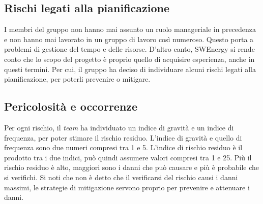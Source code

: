 \subsection{Rischi legati alla pianificazione}
I membri del gruppo non hanno mai assunto un ruolo manageriale in
precedenza e non hanno mai lavorato in un gruppo di lavoro così
numeroso. Questo porta a problemi di gestione del tempo e delle
risorse. D'altro canto, SWEnergy si rende conto che lo scopo del
progetto è proprio quello di acquisire esperienza, anche in questi
termini. Per cui, il gruppo ha deciso di individuare alcuni
rischi legati alla pianificazione, per poterli prevenire o mitigare.






\subsection{Pericolosità e occorrenze}

Per ogni rischio, il \textit{team} ha individuato un indice di gravità e un
indice di frequenza, per poter stimare il rischio residuo. L'indice di
gravità e quello di frequenza sono due numeri compresi tra 1 e 5. L'indice di
rischio residuo è il prodotto tra i due indici, può quindi assumere valori
compresi tra 1 e 25. Più il rischio residuo è alto, maggiori sono i danni che
può causare e più è probabile che si verifichi. Si noti che non è detto che il
verificarsi del rischio causi i danni massimi, le strategie di
mitigazione servono proprio per prevenire e attenuare i danni.


